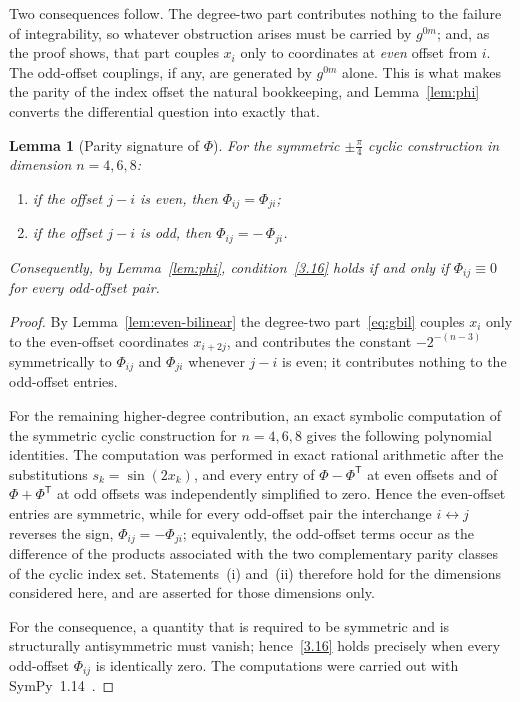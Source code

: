 \documentclass[11pt]{jfm}
\newtheorem{lemma}{Lemma}[section]
\numberwithin{equation}{section}
\begin{document}
\noindent Two consequences follow. The degree-two part contributes nothing to the failure of
integrability, so whatever obstruction arises must be carried by $g^{0m}$; and, as the proof
shows, that part couples $x_i$ only to coordinates at \emph{even} offset from $i$. The odd-offset
couplings, if any, are generated by $g^{0m}$ alone. This is what makes the parity of the index
offset the natural bookkeeping, and Lemma~\ref{lem:phi} converts the differential question into
exactly that.

\begin{lemma}[Parity signature of $\Phi$]
\label{lem:parity}
For the symmetric $\pm\tfrac{\pi}{4}$ cyclic construction in dimension $n=4,6,8$:
\begin{enumerate}
\item[(i)] if the offset $j-i$ is \emph{even}, then $\Phi_{ij}=\Phi_{ji}$;
\item[(ii)] if the offset $j-i$ is \emph{odd}, then $\Phi_{ij}=-\,\Phi_{ji}$.
\end{enumerate}
Consequently, by Lemma~\ref{lem:phi}, condition~\eqref{3.16} holds if and only if
$\Phi_{ij}\equiv 0$ for every odd-offset pair.
\end{lemma}

\begin{proof}
By Lemma~\ref{lem:even-bilinear} the degree-two part~\eqref{eq:gbil} couples $x_i$ only to the
even-offset coordinates $x_{i+2j}$, and contributes the constant
$-2^{-(n-3)}$ symmetrically to $\Phi_{ij}$ and $\Phi_{ji}$ whenever
$j-i$ is even; it contributes nothing to the odd-offset entries.

For the remaining higher-degree contribution, an exact symbolic computation of the symmetric cyclic
construction for $n=4,6,8$ gives the following polynomial identities. The computation was
performed in exact rational arithmetic after the substitutions $s_k=\sin(2x_k)$, and every entry of
$\Phi-\Phi^{\mathsf T}$ at even offsets and of $\Phi+\Phi^{\mathsf T}$ at odd offsets was
independently simplified to zero. Hence the even-offset entries are symmetric, while for every
odd-offset pair the interchange $i\leftrightarrow j$ reverses the sign, $\Phi_{ij}=-\Phi_{ji}$;
equivalently, the odd-offset terms occur as the difference of the products associated with the two
complementary parity classes of the cyclic index set. Statements~(i) and~(ii) therefore hold for
the dimensions considered here, and are asserted for those dimensions only.

For the consequence, a quantity that is required to be symmetric and is structurally antisymmetric
must vanish; hence~\eqref{3.16} holds precisely when every odd-offset $\Phi_{ij}$ is identically
zero. The computations were carried out with SymPy~1.14~\citep{sympy2017}.
\end{proof}
\end{document}
